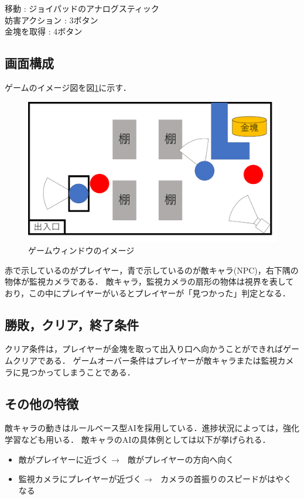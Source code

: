 \documentclass{jarticle}
\begin{document}
移動 : ジョイパッドのアナログスティック\\
妨害アクション : 3ボタン\\
金塊を取得 : 4ボタン\\


\subsection{画面構成}
ゲームのイメージ図を図\ref{fig:gameimg}に示す．

\begin{figure}[H]
\begin{center}
\includegraphics[width=\linewidth]{./zu/gamewindow.png}
\caption{ゲームウィンドウのイメージ}
\label{fig:gameimg}
\end{center}
\end{figure}

赤で示しているのがプレイヤー，青で示しているのが敵キャラ(NPC)，右下隅の物体が監視カメラである．
敵キャラ，監視カメラの扇形の物体は視界を表しており，この中にプレイヤーがいるとプレイヤーが「見つかった」判定となる．

\subsection{勝敗，クリア，終了条件}
クリア条件は，プレイヤーが金塊を取って出入り口へ向かうことができればゲームクリアである．
ゲームオーバー条件はプレイヤーが敵キャラまたは監視カメラに見つかってしまうことである．

\subsection{その他の特徴}
敵キャラの動きはルールベース型AIを採用している．進捗状況によっては，強化学習なども用いる．
敵キャラのAIの具体例としては以下が挙げられる．
\begin{itemize}
\item 敵がプレイヤーに近づく →　敵がプレイヤーの方向へ向く
\item 監視カメラにプレイヤーが近づく →　カメラの首振りのスピードがはやくなる
\end{itemize}
\end{document}
